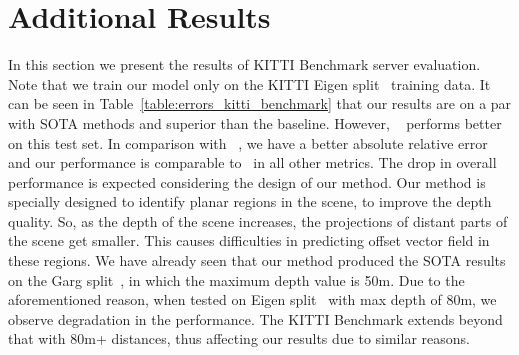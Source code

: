 \documentclass[final]{cvpr}
\newcommand{\PAR}[1]{\vskip2pt \noindent{\bf #1}}
\begin{document}
\section{Additional Results}
\label{appendix:results}
\PAR{KITTI Benchmark~\cite{kitti}:}
In this section we present the results of KITTI Benchmark server evaluation. Note that we train our model only on the KITTI Eigen split~\cite{depth:multiscale:network} training data. It can be seen in Table~\ref{table:errors_kitti_benchmark} that our results are on a par with SOTA methods and superior than the baseline. However, ~\cite{local:planar:guidance} performs better on this test set. In comparison with ~\cite{virtual:normal:depth}, we have a better absolute relative error and our performance is comparable to~\cite{virtual:normal:depth} in all other metrics. The drop in overall performance is expected considering the design of our method. Our method is specially designed to identify planar regions in the scene, to improve the depth quality. So, as the depth of the scene increases, the projections of distant parts of the scene get smaller. This causes difficulties in predicting offset vector field in these regions. We have already seen that our method produced the SOTA results on the Garg split~\cite{unsupervised:cnn:single:view:depth}, in which the maximum depth value is 50m. Due to the aforementioned reason, when tested on Eigen split~\cite{depth:multiscale:network} with max depth of 80m, we observe degradation in the performance. The KITTI Benchmark extends beyond that with 80m+ distances, thus affecting our results due to similar reasons.     

\begin{table}[H]
 \caption{\textbf{Results of KITTI Evaluation Server.}}
\label{table:errors_kitti_benchmark}
\end{table}
\end{document}
